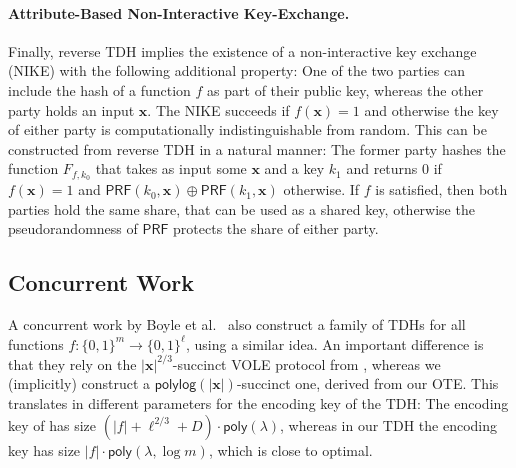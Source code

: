 \documentclass{theoretics}
\newcommand{\poly}{\mathsf{poly}}
\newcommand{\polylog}{\mathsf{polylog}}
\renewcommand{\sec}{\ensuremath{\lambda}}
\begin{document}
\paragraph{Attribute-Based Non-Interactive Key-Exchange.} Finally, reverse TDH implies the existence of a non-interactive key exchange (NIKE) with the following additional property: One of the two parties can include the hash of a function $f$ as part of their public key, whereas the other party holds an input $\mathbf{x}$. The NIKE succeeds if $f(\mathbf{x}) = 1$ and otherwise the key of either party is computationally indistinguishable from random. This can be constructed from reverse TDH in a natural manner: The former party hashes the function $F_{f, k_0}$ that takes as input some $\mathbf{x}$ and a key $k_1$ and returns $0$ if $f(\mathbf{x}) = 1$ and $\mathsf{PRF}(k_0 , \mathbf{x}) \oplus \mathsf{PRF}(k_1 , \mathbf{x})$ otherwise. If $f$ is satisfied, then both parties hold the same share, that can be used as a shared key, otherwise the pseudorandomness of $\mathsf{PRF}$ protects the share of either party. 




\subsection{Concurrent Work}

A concurrent work by Boyle et al.~\cite{EC:BJSS25} also construct a family of TDHs for all functions $f:\{0,1\}^m \to \{0,1\}^\ell$, using a similar idea. An important difference is that they rely on the $|\mathbf{x}|^{2/3}$-succinct VOLE protocol from \cite{EC:AbrRoySch24}, whereas we (implicitly) construct a $\polylog(|\mathbf{x}|)$-succinct one, derived from our OTE. This translates in different parameters for the encoding key of the TDH: The encoding key of \cite{EC:BJSS25} has size $(|f|+ \ell^{2/3} + D)\cdot \poly(\sec)$, whereas in our TDH the encoding key has size $\lvert f\rvert \cdot \poly(\sec, \log m)$, which is close to optimal.
\end{document}
